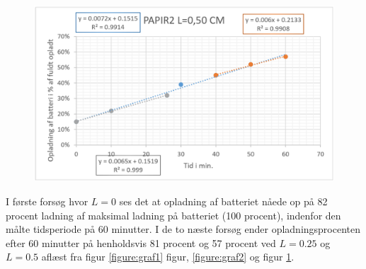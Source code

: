 \begin{figure}[H]
\centering
\includegraphics[width=1\textwidth]{Setup/forsg2_graf3}
\label{figure:graf3}
\caption{}
\end{figure}

\newpage

I første forsøg hvor $L = 0$ ses det at opladning af batteriet nåede op på 82 procent ladning af maksimal ladning på batteriet (100 procent), indenfor den målte tidsperiode på 60 minutter. I de to næste forsøg ender opladningsprocenten efter 60 minutter på henholdsvis 81 procent og 57 procent ved $L = 0.25$ og $L = 0.5$ aflæst fra figur \ref{figure:graf1} figur, \ref{figure:graf2} og figur \ref{figure:graf3}.

